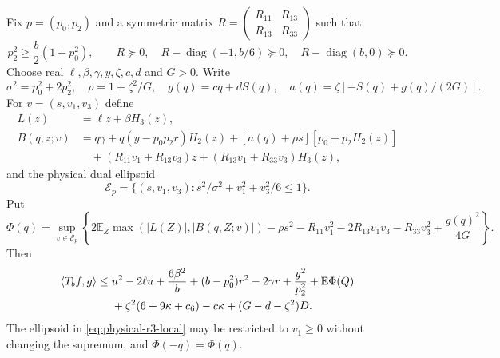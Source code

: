 \begin{proposition}
\label{prop:physical-r3-dual}
Fix $p=(p_0,p_2)$ and a symmetric matrix
$R=\left(\begin{smallmatrix}R_{11}&R_{13}\\R_{13}&R_{33}\end{smallmatrix}\right)$
such that
\begin{equation}\label{eq:physical-r3-gates}
 p_2^2\geq\frac b2(1+p_0^2),\qquad
 R\succeq0,\quad R-\operatorname{diag}(-1,b/6)\succeq0,
 \quad R-\operatorname{diag}(b,0)\succeq0.
\end{equation}
Choose real $\ell,\beta,\gamma,y,\zeta,c,d$ and $G>0$.  Write
\[
 \sigma^2=p_0^2+2p_2^2,\quad \rho=1+\zeta^2/G,\quad
 g(q)=cq+dS(q),\quad a(q)=\zeta[-S(q)+g(q)/(2G)].
\]
For $v=(s,v_1,v_3)$ define
\begin{align*}
 L(z)&=\ell z+\beta H_3(z),\\
 B(q,z;v)&=q\gamma+q(y-p_0p_2r)H_2(z)
       +[a(q)+\rho s][p_0+p_2H_2(z)]\\
 &\quad +(R_{11}v_1+R_{13}v_3)z
       +(R_{13}v_1+R_{33}v_3)H_3(z),
\end{align*}
and the physical dual ellipsoid
\[
 \mathcal E_p=\{(s,v_1,v_3):s^2/\sigma^2+v_1^2+v_3^2/6\leq1\}.
\]
Put
\begin{equation}\label{eq:physical-r3-local}
 \Phi(q)=\sup_{v\in\mathcal E_p}\left\{
 2\mathbb E_Z\max(|L(Z)|,|B(q,Z;v)|)
 -\rho s^2-R_{11}v_1^2-2R_{13}v_1v_3-R_{33}v_3^2
 +\frac{g(q)^2}{4G}\right\}.
\end{equation}
Then
\begin{align}\label{eq:physical-r3-criterion}
 \langle T_bf,g\rangle\leq{}&u^2-2\ell u+\frac{6\beta^2}{b}
 +(b-p_0^2)r^2-2\gamma r+\frac{y^2}{p_2^2}
 +\mathbb E\Phi(Q)\notag\\
 &+\zeta^2(6+9\kappa+c_6)-c\kappa+(G-d-\zeta^2)D.
\end{align}
The ellipsoid in \eqref{eq:physical-r3-local} may be restricted to
$v_1\geq0$ without changing the supremum, and $\Phi(-q)=\Phi(q)$.
\end{proposition}
